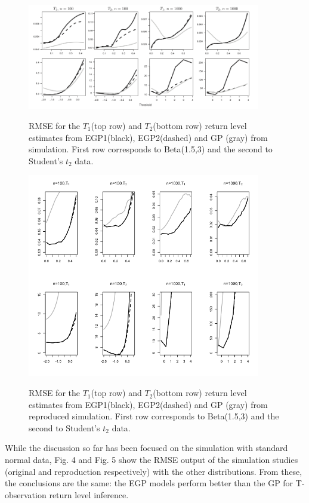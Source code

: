 \documentclass[12pt]{article}
\theoremstyle{definition}
\theoremstyle{definition}
\begin{document}
\begin{figure}[H]
\begin{center}
{\includegraphics[width=4.0in]{project/papafiles/fig4.papa.png}}
\caption{RMSE for the $T_1$(top row) and $T_2$(bottom row) return level estimates from EGP1(black), EGP2(dashed) and GP (gray) from \cite{papatawn} simulation. First row corresponds to Beta(1.5,3) and the second to Student's $t_2$ data.}
\end{center}
\end{figure}
\begin{figure}[H]
\begin{center}
{\includegraphics[width=4.0in]{project/papafiles/fig4.me.png}}
\caption{RMSE for the $T_1$(top row) and $T_2$(bottom row) return level estimates from EGP1(black), EGP2(dashed) and GP (gray) from reproduced simulation. First row corresponds to Beta(1.5,3) and the second to Student's $t_2$ data.}
\end{center}
\end{figure}

While the discussion so far has been focused on the simulation with standard normal data, Fig. 4 and Fig. 5 show the RMSE output of the simulation studies (original and reproduction respectively) with the other distributions. From these, the conclusions are the same: the EGP models perform better than the GP for T-observation return level inference.
\end{document}
